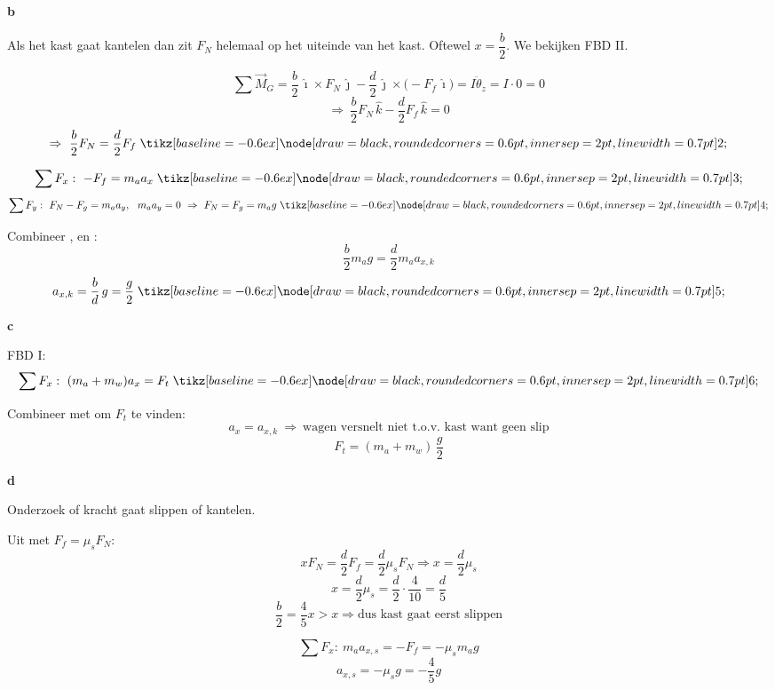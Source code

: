 \vspace{2mm}

\textbf{b}

Als het kast gaat kantelen dan zit $F_N$ helemaal op het uiteinde van het kast.
Oftewel $x=\dfrac{b}{2}$. 
We bekijken FBD II.

\[
\sum \vec M_G
=\frac{b}{2}\,\hat{\imath}\times F_N\,\hat{\jmath}
-\frac{d}{2}\,\hat{\jmath}\times\bigl(-F_f\,\hat{\imath}\bigr)
=I\ddot\theta_z
=I\cdot 0
=0
\]
\[
\Rightarrow\ \frac{b}{2}F_N\,\hat{k}-\frac{d}{2}F_f\,\hat{k}=0
\]
\[
\Rightarrow\ \frac{b}{2}F_N=\frac{d}{2}F_f
\stepbox{2}
\]

\[
\sum F_x:\ -F_f=m_a a_x
\stepbox{3}
\]
\[
\sum F_y:\ F_N-F_g=m_a a_y,\ \ m_a a_y=0\ \Rightarrow\ F_N=F_g=m_a g
\stepbox{4}
\]

Combineer ,  en :
\[
\frac{b}{2}m_a g=\frac{d}{2}m_a a_{x,k}
\]
\[
a_{x,k}=\frac{b}{d}\,g=\frac{g}{2}
\stepbox{5}
\]

\vspace{2mm}

\textbf{c}

FBD I:
\[
\sum F_x:\ (m_a+m_w)a_x=F_t
\stepbox{6}
\]

Combineer  met  om $F_t$ te vinden:
\[
a_x=a_{x,k}\ \Rightarrow\ \text{wagen versnelt niet t.o.v.\ kast want geen slip}
\]
\[
F_t=(m_a+m_w)\,\frac{g}{2}
\]

\vspace{2mm}

\textbf{d}

Onderzoek of kracht gaat slippen of kantelen.

Uit  met $F_f=\mu_s F_N$:
\[
xF_N=\frac{d}{2}F_f=\frac{d}{2}\mu_s F_N
\Rightarrow
x=\frac{d}{2}\mu_s
\]
\[
x=\frac{d}{2}\mu_s=\frac{d}{2}\cdot\frac{4}{10}=\frac{d}{5}
\]
\[
\frac{b}{2}=\frac{4}{5}x>x
\Rightarrow
\text{dus kast gaat eerst slippen}
\]

\[
\sum F_x:\ m_a a_{x,s}=-F_f=-\mu_s m_a g
\]
\[
a_{x,s}=-\mu_s g=-\frac{4}{5}g
\]







